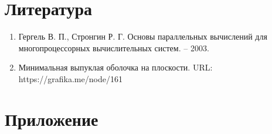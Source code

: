 \documentclass{report}
\begin{document}
\section*{Литература}
\begin{enumerate}
\item Гергель В. П., Стронгин Р. Г. Основы параллельных вычислений для многопроцессорных вычислительных систем. – 2003.
\item Минимальная выпуклая оболочка на плоскости. \newline URL: https://grafika.me/node/161
\end{enumerate} 
\newpage

\section*{Приложение}
\end{document}
